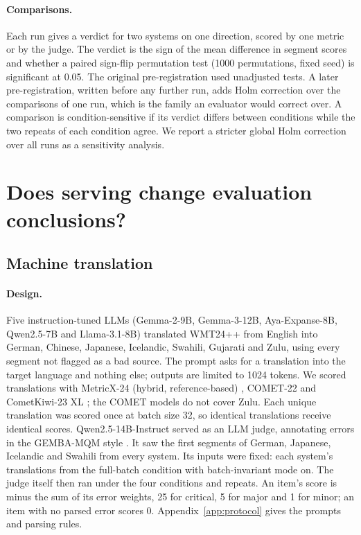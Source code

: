 \paragraph{Comparisons.} Each run gives a verdict for two systems on one direction, scored by one metric or by the judge. The verdict is the sign of the mean difference in segment scores and whether a paired sign-flip permutation test (1000 permutations, fixed seed) is significant at 0.05. The original pre-registration used unadjusted tests. A later pre-registration, written before any further run, adds Holm correction over the comparisons of one run, which is the family an evaluator would correct over. A comparison is condition-sensitive if its verdict differs between conditions while the two repeats of each condition agree. We report a stricter global Holm correction over all runs as a sensitivity analysis.

\section{Does serving change evaluation conclusions?}\label{sec:evalvar}
\subsection{Machine translation}\label{sec:mtvar}
\paragraph{Design.} Five instruction-tuned LLMs (Gemma-2-9B, Gemma-3-12B, Aya-Expanse-8B, Qwen2.5-7B and Llama-3.1-8B) translated WMT24++ \citep{deutsch2025wmt24pp} from English into German, Chinese, Japanese, Icelandic, Swahili, Gujarati and Zulu, using every segment not flagged as a bad source. The prompt asks for a translation into the target language and nothing else; outputs are limited to 1024 tokens. We scored translations with MetricX-24 (hybrid, reference-based) \citep{juraska-etal-2024-metricx}, COMET-22 \citep{rei-etal-2022-comet} and CometKiwi-23 XL \citep{rei-etal-2023-scaling}; the COMET models do not cover Zulu. Each unique translation was scored once at batch size 32, so identical translations receive identical scores. Qwen2.5-14B-Instruct served as an LLM judge, annotating errors in the GEMBA-MQM style \citep{kocmi2023gemba,kocmi2023gembamqm}. It saw the first \XJudgeItems{} segments of German, Japanese, Icelandic and Swahili from every system. Its inputs were fixed: each system's translations from the full-batch condition with batch-invariant mode on. The judge itself then ran under the four conditions and repeats. An item's score is minus the sum of its error weights, 25 for critical, 5 for major and 1 for minor; an item with no parsed error scores 0. Appendix~\ref{app:protocol} gives the prompts and parsing rules.

